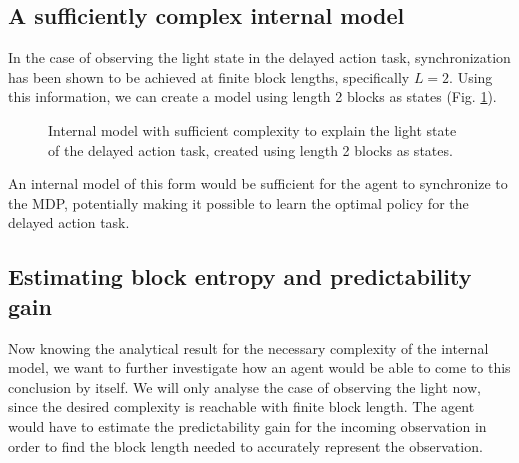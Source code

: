 \documentclass[12pt,a4paper]{article}
\begin{document}
\subsection{A sufficiently complex internal model} \label{ssec:sufficient_internal_model}
In the case of observing the light state in the delayed action task, synchronization has been shown to be achieved at finite block lengths, specifically $L=2$.
Using this information, we can create a model using length 2 blocks as states (Fig. \ref{fig:mp1_L2}).

\begin{figure}[H]
    \hspace{2cm}
    \caption{\label{fig:mp1_L2} Internal model with sufficient complexity to explain the light state of the delayed action task, created using length 2 blocks as states.}
\end{figure}

An internal model of this form would be sufficient for the agent to synchronize to the MDP, potentially making it possible to learn the optimal policy for the delayed action task.

\subsection{Estimating block entropy and predictability gain} \label{ssec:est_block_and_pred_gain}
Now knowing the analytical result for the necessary complexity of the internal model, we want to further investigate how an agent would be able to come to this conclusion by itself.
We will only analyse the case of observing the light now, since the desired complexity is reachable with finite block length.
The agent would have to estimate the predictability gain for the incoming observation in order to find the block length needed to accurately represent the observation.
\end{document}
